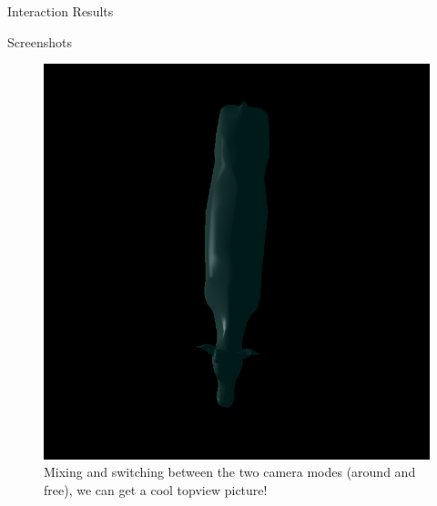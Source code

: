 \documentclass{article}
\begin{document}
\begin{section}{Interaction Results}
\begin{multicols}{2}
\begin{subsection}{Screenshots}
    \begin{figure}[H]
     \includegraphics[width=\linewidth]{./res/topview.png}
     \caption{Mixing and switching between the two camera modes (around and
free), we can get a cool topview picture!}
    \end{figure}


\end{subsection}
\end{multicols}
\end{section}
\end{document}
